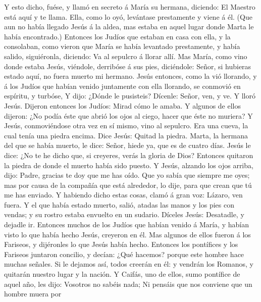  Y esto dicho, fuése, y llamó en secreto á María su
hermana, diciendo: El Maestro está aquí y te llama.  Ella,
como lo oyó, levántase prestamente y viene á él.  (Que aun
no había llegado Jesús á la aldea, mas estaba en aquel lugar donde Marta
le había encontrado.)  Entonces los Judíos que estaban en
casa con ella, y la consolaban, como vieron que María se había levantado
prestamente, y había salido, siguiéronla, diciendo: Va al sepulcro á
llorar allí.  Mas María, como vino donde estaba Jesús,
viéndole, derribóse á sus pies, diciéndole: Señor, si hubieras estado
aquí, no fuera muerto mi hermano.  Jesús entonces, como la
vió llorando, y á los Judíos que habían venido juntamente con ella
llorando, se conmovió en espíritu, y turbóse,  Y dijo:
¿Dónde le pusisteis? Dícenle: Señor, ven, y ve.  Y lloró
Jesús.  Dijeron entonces los Judíos: Mirad cómo le amaba.
 Y algunos de ellos dijeron: ¿No podía éste que abrió los
ojos al ciego, hacer que éste no muriera?  Y Jesús,
conmoviéndose otra vez en sí mismo, vino al sepulcro. Era una cueva, la
cual tenía una piedra encima.  Dice Jesús: Quitad la
piedra. Marta, la hermana del que se había muerto, le dice: Señor, hiede
ya, que es de cuatro días.  Jesús le dice: ¿No te he dicho
que, si creyeres, verás la gloria de Dios?  Entonces
quitaron la piedra de donde el muerto había sido puesto. Y Jesús,
alzando los ojos arriba, dijo: Padre, gracias te doy que me has oído.
 Que yo sabía que siempre me oyes; mas por causa de la
compañía que está alrededor, lo dije, para que crean que tú me has
enviado.  Y habiendo dicho estas cosas, clamó á gran voz:
Lázaro, ven fuera.  Y el que había estado muerto, salió,
atadas las manos y los pies con vendas; y su rostro estaba envuelto en
un sudario. Díceles Jesús: Desatadle, y dejadle ir. 
Entonces muchos de los Judíos que habían venido á María, y habían visto
lo que había hecho Jesús, creyeron en él.  Mas algunos de
ellos fueron á los Fariseos, y dijéronles lo que Jesús había hecho.
 Entonces los pontífices y los Fariseos juntaron concilio,
y decían: ¿Qué hacemos? porque este hombre hace muchas señales.
 Si le dejamos así, todos creerán en él: y vendrán los
Romanos, y quitarán nuestro lugar y la nación.  Y Caifás,
uno de ellos, sumo pontífice de aquel año, les dijo: Vosotros no sabéis
nada;  Ni pensáis que nos conviene que un hombre muera por
